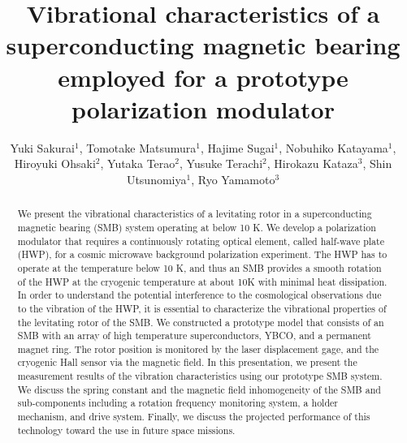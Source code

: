 \documentclass[a4paper]{jpconf}
\begin{document}
\title{Vibrational characteristics of a superconducting magnetic bearing employed for a prototype polarization modulator}

\author{Yuki Sakurai$^{1}$, Tomotake Matsumura$^{1}$, Hajime Sugai$^{1}$, Nobuhiko Katayama$^{1}$, Hiroyuki Ohsaki$^{2}$, Yutaka Terao$^{2}$, Yusuke Terachi$^{2}$, Hirokazu Kataza$^{3}$, Shin Utsunomiya$^{1}$, Ryo Yamamoto$^{3}$}
\vspace{2mm}
\address{
$^{1}$Kavli Institute for the Physics and Mathematics of the Universe (WPI),The University of Tokyo Institutes for Advanced Study, The University of Tokyo, 5-1-5 Kashiwanoha, Kashiwa, Chiba 277-8583, Japan \\
$^{2}$Graduate School of Frontier Sciences, The University of Tokyo, 5-1-5 Kashiwanoha, Kashiwa, Chiba 277-8561, Japan \\
$^{3}$Japan Aerospace Exploration Agency, Institute of Space and Astronautical Science (ISAS), 3-1-1 Yoshinodai, Chuo-ku, Sagamihara, Kanagawa 252-5210, Japan
}


\begin{abstract}
We present the vibrational characteristics of a levitating rotor in a superconducting magnetic bearing (SMB) system operating at below 10 K.
We develop a polarization modulator that requires a continuously rotating optical element, called half-wave plate (HWP), for a cosmic microwave background polarization experiment.
The HWP has to operate at the temperature below 10 K, and thus an SMB provides a smooth rotation of the HWP at the cryogenic temperature at about 10K with minimal heat dissipation.
In order to understand the potential interference to the cosmological observations due to the vibration of the HWP,
it is essential to characterize the vibrational properties of the levitating rotor of the SMB.
We constructed a prototype model that consists of an SMB with an array of high temperature superconductors, YBCO, and a permanent magnet ring.
The rotor position is monitored by the laser displacement gage, and the cryogenic Hall sensor via the magnetic field.
In this presentation, we present the measurement results of the vibration characteristics using our prototype SMB system.
We discuss the spring constant and the magnetic field inhomogeneity of the SMB and sub-components including a rotation frequency monitoring system, a holder mechanism, and drive system.
Finally, we discuss the projected performance of this technology toward the use in future space missions.
\end{abstract}
\end{document}
